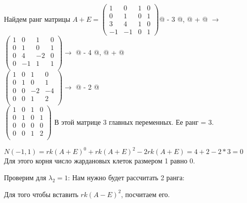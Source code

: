 \documentclass[a4paper,12pt]{article}
\makeatletter
\newcommand*{\rom}[1]{\expandafter\@slowromancap\romannumeral #1@}
\makeatother
\begin{document}
\begin{enumerate}
Найдем ранг матрицы $A+E = \begin{pmatrix}
1 & 0 & 1 & 0\\
0 & 1 & 0 & 1\\
3 & 4 & 1 & 0\\
-1 & -1 & 0 & 1
\end{pmatrix}$\rom{3} - 3 \rom{1}, \rom{4} + \rom{1} $\rightarrow$\\
$
\left(\begin{array}{cccc}  
1&0&1&0\\
0&1&0&1\\
0&4&-2&0\\
0&-1&1&1\\
\end{array}\right) \rightarrow$  \rom{3} - 4 \rom{2}, \rom{4} + \rom{2} \\
$
\left(\begin{array}{cccc}  
1&0&1&0\\
0&1&0&1\\
0&0&-2&-4\\
0&0&1&2\\
\end{array}\right) \rightarrow$  \rom{3} - 2 \rom{4} \\
$
\left(\begin{array}{cccc}  
1&0&1&0\\
0&1&0&1\\
0&0&0&0\\
0&0&1&2\\
\end{array}\right) $  В этой матрице 3 главных переменных. Ее ранг = 3.

$N(-1,1)=rk(A+E)^0+rk(A+E)^2-2rk(A+E) =  4+2-2*3=0$ Для этого корня число жардановых клеток размером 1 равно 0.



Проверим для $\lambda_2 = 1$:
Нам нужно будет рассчитать 2 ранга:

Для того чтобы вставить $rk(A-E)^2$, посчитаем его.


\end{enumerate}
\end{document}
